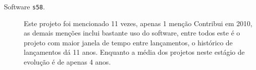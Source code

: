 \begin{description}
  \item[Software \texttt{s58}.]
    Este projeto foi mencionado 11 vezes, apenas 1 menção Contribui em 2010, as
    demais menções inclui bastante uso do software, entre todos este é o
    projeto com maior janela de tempo entre lançamentos, o histórico de
    lançamentos dá 11 anos. Enquanto a média dos projetos neste estágio de evolução
    é de apenas 4 anos.


\end{description}

%
%
%
%


